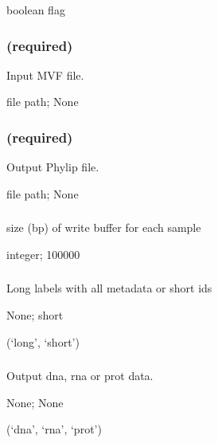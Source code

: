 \documentclass[letterpaper,11pt,english]{sphinxmanual}
\begin{document}
 boolean flag


\subsubsection{ (required)}
\label{\detokenize{prog_desc:id23}}
 Input MVF file.

 file path;  None


\subsubsection{ (required)}
\label{\detokenize{prog_desc:id24}}
 Output Phylip file.

 file path;  None


\subsubsection{}
\label{\detokenize{prog_desc:id25}}
 size (bp) of write buffer for each sample

 integer;  100000


\subsubsection{}
\label{\detokenize{prog_desc:id26}}
 Long labels with all metadata or short ids

 None;  short

 (‘long’, ‘short’)


\subsubsection{}
\label{\detokenize{prog_desc:id27}}
 Output dna, rna or prot data.

 None;  None

 (‘dna’, ‘rna’, ‘prot’)
\end{document}
